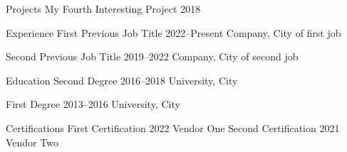 \documentclass{cv}
\begin{document}
\begin{career}
{\begin{careersection}{Projects}
{        }
        \careeritem
	{My Fourth Interesting Project} %
        {2018} %
        {} %
        { %
        \begin{careeritemdetails}
	\item \lipsum[8][1-2] 
	\item \lipsum[8][3-4]
	\item \lipsum[8][5-6]
        \end{careeritemdetails}
        }
    \end{careersection}
    }
    \columnbreak
    \begin{careersection}{Experience}
        \careeritem
        {First Previous Job Title}
        {2022--Present}
        {Company, City of first job}
        {
        \begin{careeritemdetails}	
	    \item \lipsum[9][1-2] 
	    \item \lipsum[9][3-4]
        \end{careeritemdetails}
        }
        \careeritem
        {Second Previous Job Title}
        {2019--2022}
        {Company, City of second job}
        {
        \begin{careeritemdetails}	
	    \item \lipsum[10][1-2] 
	    \item \lipsum[10][3-4]
        \end{careeritemdetails}
        }
    \end{careersection}
    \vfill
    \begin{careersection}{Education}
        \careeritem
        {Second Degree}
        {2016--2018}
        {University, City}
        {
        \begin{careeritemdetails}	
	    \item \lipsum[11][1-2]
        \end{careeritemdetails}
        }
        \careeritem
        {First Degree}
        {2013--2016}
        {University, City}
        {
        \begin{careeritemdetails}	
	    \item \lipsum[12][1-2]
        \end{careeritemdetails}
        }
    \end{careersection}
    \vfill
    \begin{careersection}{Certifications}
        \careeritem
	{First Certification}
        {2022}
        {Vendor One}
        {}
        \careeritem
	{Second Certification}
        {2021}
        {Vendor Two}
        {}
    \end{careersection}

\end{career}
\end{document}
